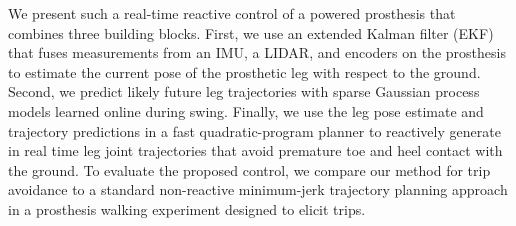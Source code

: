 We present such a real-time reactive control of a powered prosthesis that
combines three building blocks. First, we use an extended Kalman filter (EKF)
that fuses measurements from an IMU, a LIDAR, and encoders on the prosthesis to
estimate the current pose of the prosthetic leg with respect to the ground.
Second, we predict likely future leg trajectories with sparse Gaussian process
models learned online during swing. Finally, we use the leg pose estimate and
trajectory predictions in a fast quadratic-program planner to reactively
generate in real time leg joint trajectories that avoid premature toe and heel
contact with the ground. To evaluate the proposed control, we compare our method
for trip avoidance to a standard non-reactive minimum-jerk trajectory planning
approach in a prosthesis walking experiment designed to elicit trips.

\begin{comment}
The motion planning algorithm must account for
human strategies for collision avoidance to ensure natural motion. A study of
the kinematics of obstacle clearance by Austin et al. [] showed that the
heel-contact distant is invariant to the obstacle height, however angular
velocity increases as the time of impact is critical to the gait. This also
borne out by the observation that knee and ankle flexion increased with larger
obstacle heights, possibly to return the leg to the ground quickly.

When designing an environment-aware motion planning algorithm, vision can be
considered to be one of the most essential inputs. Patla et al. [] showed
subjects failing nearly 50\% of the time attempting to negotiate an obstacle
with their vision occluded, concluding that their incorrect foot placement was
the main factor for the trips. 

it is known that human

\end{comment}





